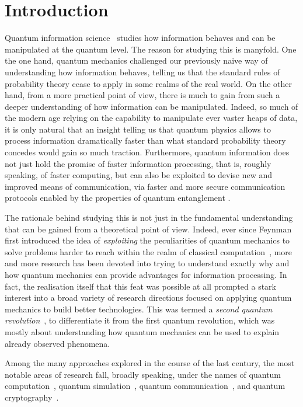 \chapter{Introduction}
Quantum information science~\cite{nielsen2006quantum,watrous2018theory} studies how information behaves and can be manipulated at the quantum level.
The reason for studying this is manyfold. One the one hand, quantum mechanics challenged our previously naive way of understanding how information behaves, telling us that the standard rules of probability theory cease to apply in some realms of the real world.
On the other hand, from a more practical point of view, there is much to gain from such a deeper understanding of how information can be manipulated. Indeed, so much of the modern age relying on the capability to manipulate ever vaster heaps of data, it is only natural that an insight telling us that quantum physics allows to process information dramatically faster than what standard probability theory concedes would gain so much traction.
Furthermore, quantum information does not just hold the promise of faster information processing, that is, roughly speaking, of faster computing, but can also be exploited to devise new and improved means of communication, via faster and more secure communication protocols enabled by the properties of quantum entanglement .

The rationale behind studying this is not just in the fundamental understanding that can be gained from a theoretical point of view. Indeed, ever since Feynman first introduced the idea of \emph{exploiting} the peculiarities of quantum mechanics to solve problems harder to reach within the realm of classical computation~\cite{feynman1982simulating}, more and more research has been devoted into trying to understand exactly why and how quantum mechanics can provide advantages for information processing.
In fact, the realisation itself that this feat was possible at all prompted a stark interest into a broad variety of research directions focused on applying quantum mechanics to build better technologies. This was termed a \textit{second quantum revolution}~\cite{dowling2003quantum}, to differentiate it from the first quantum revolution, which was mostly about understanding how quantum mechanics can be used to explain already observed phenomena.

Among the many approaches explored in the course of the last century, the most notable areas of research fall, broadly speaking, under the names of quantum computation~\cite{shor1997polynomial,steane1998quantum,ladd2010quantum}, quantum simulation~\cite{lloyd1996universal,georgescu2014quantum,koch2019quantum}, quantum communication~\cite{bennett1993teleporting}, and quantum cryptography~\cite{bennett2014quantum}.

